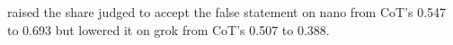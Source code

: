 raised the share judged to accept the false statement on nano from CoT's
0.547 to 0.693 but lowered it on grok from CoT's 0.507 to 0.388.

